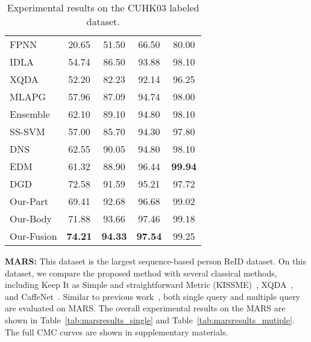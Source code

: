 \documentclass[10pt,twocolumn,letterpaper]{article}
\begin{document}
\begin{table}[!tbp]
\begin{center}
\begin{tabular}{|l|cccc|}
    \hline
    \hline
    FPNN~\cite{LiWeiCVPR14}  & 20.65  & 51.50  & 66.50  & 80.00  \\
    IDLA~\cite{AhmedCVPR15improved}  & 54.74  & 86.50  & 93.88  & 98.10  \\
    XQDA~\cite{LiaoshengcaiCVPR15}  & 52.20  & 82.23  & 92.14  & 96.25  \\
    MLAPG~\cite{LiaoshengcaiICCV15} & 57.96  & 87.09  & 94.74  & 98.00  \\
    Ensemble~\cite{PaisitkriangkraiCVPR15} & 62.10  & 89.10  & 94.80  & 98.10  \\
    SS-SVM~\cite{ZhangCVPR16sample} & 57.00  & 85.70  & 94.30  & 97.80  \\
    DNS~\cite{ZhangLiCVPR16}   & 62.55  & 90.05  & 94.80  & 98.10  \\
    EDM~\cite{Shihanlin2016Embedding}   & 61.32  & 88.90  & 96.44  & \textbf{99.94}  \\
    DGD~\cite{XiaotongCVPR16Domain}   & 72.58  & 91.59  & 95.21  & 97.72 \\
    \hline
    \hline
    Our-Part & 69.41  & 92.68  & 96.68  & 99.02  \\
    Our-Body & 71.88  & 93.66  & 97.46  & 99.18  \\
    Our-Fusion & \textbf{74.21}  & \textbf{94.33}  & \textbf{97.54}  & 99.25    \\
    \hline
    \end{tabular}\end{center}
  \vspace{-0.5em}
  \caption{Experimental results on the CUHK03 labeled dataset.}
  \label{tab:cuhk03labeledresults}\vspace{-1em}
\end{table}


\textbf{MARS:} This dataset is the largest sequence-based person ReID dataset.
On this dataset, we compare the proposed method with several classical methods, including Keep It as Simple and straightforward Metric (KISSME)~\cite{KostingerCVPR12}, XQDA~\cite{LiaoshengcaiCVPR15}, and CaffeNet~\cite{KrizhevskyNIPS12}.
Similar to previous work~\cite{ZhengliangECCV16}, both single query and multiple query are evaluated on MARS.
The overall experimental results on the MARS are shown in Table~\ref{tab:marsresults_single} and Table~\ref{tab:marsresults_mutiple}.
The full CMC curves are shown in supplementary materials.
\end{document}
